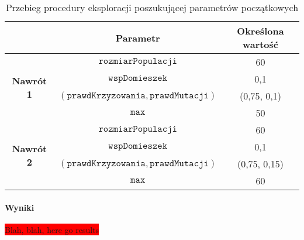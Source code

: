 \documentclass[twoside]{iisthesis}
\newcommand{\todo}{\colorbox{red}}
\newcommand{\param}[1]{\mathtt{#1}}
\begin{document}
\begin{table}[h]
	\caption{Przebieg procedury eksploracji poszukującej parametrów początkowych \label{table:knapsack_tweak_flow}}
	\centering
	\begin{tabular}{c|c|c|}
		\cline{2-3}
		& {\bf Parametr}                                     & {\bf Określona wartość} \\ \hline
		\multicolumn{1}{|c|}{\multirow{4}{*}{{\bf Nawrót 1}}} & $\param{rozmiarPopulacji}$                         & 60                      \\ \cline{2-3} 
		\multicolumn{1}{|c|}{}                                & $\param{wspDomieszek}$                             & 0,1                     \\ \cline{2-3} 
		\multicolumn{1}{|c|}{}                                & $(\param{prawdKrzyzowania}, \param{prawdMutacji})$ & (0,75, 0,1)             \\ \cline{2-3} 
		\multicolumn{1}{|c|}{}                                & $\param{max}$                                      & 50                     \\ \hline \hline
		\multicolumn{1}{|c|}{\multirow{4}{*}{{\bf Nawrót 2}}} & $\param{rozmiarPopulacji}$                         & 60                      \\ \cline{2-3} 
		\multicolumn{1}{|c|}{}                                & $\param{wspDomieszek}$                             & 0,1                     \\ \cline{2-3} 
		\multicolumn{1}{|c|}{}                                & $(\param{prawdKrzyzowania}, \param{prawdMutacji})$ & (0,75, 0,15)             \\ \cline{2-3} 
		\multicolumn{1}{|c|}{}                                & $\param{max}$                                      & 60                     \\ \hline
	\end{tabular}
\end{table}	

\paragraph{Wyniki}
\todo{Blah, blah, here go results}
\end{document}

